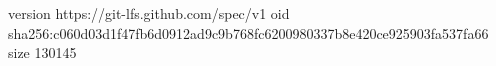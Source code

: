 version https://git-lfs.github.com/spec/v1
oid sha256:c060d03d1f47fb6d0912ad9c9b768fc6200980337b8e420ce925903fa537fa66
size 130145
